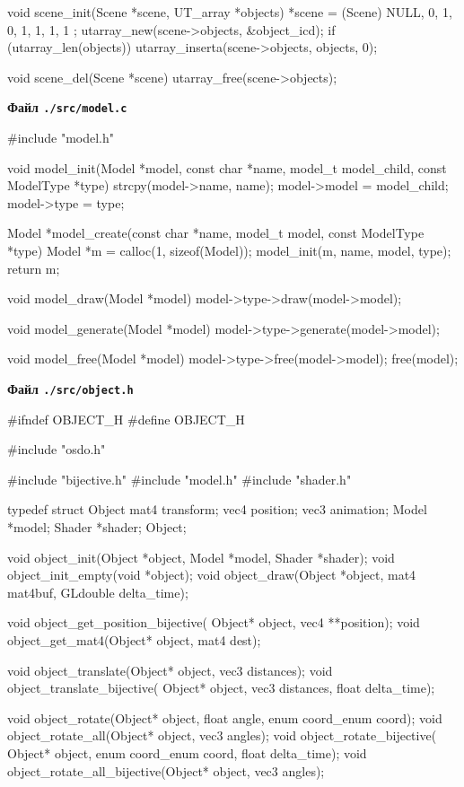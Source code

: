 \begin{multicols}{2}
\begin{ccode}
void scene_init(Scene *scene, UT_array *objects) {
    *scene = (Scene){
        NULL, 0, 1, 0, 1, 1, 1, 1
    };
    utarray_new(scene->objects, &object_icd);
    if (utarray_len(objects))
        utarray_inserta(scene->objects, objects, 0);
}

void scene_del(Scene *scene) {
    utarray_free(scene->objects);
}
\end{ccode}
\noindent\cprotect\textbf{Файл \verb+./src/model.c+}
\begin{ccode}
#include "model.h"

void model_init(Model *model, const char *name, model_t model_child, const ModelType *type) {
    strcpy(model->name, name);
    model->model = model_child;
    model->type = type;
}

Model *model_create(const char *name, model_t model, const ModelType *type) {
    Model *m = calloc(1, sizeof(Model));
    model_init(m, name, model, type);
    return m;
}

void model_draw(Model *model) {
    model->type->draw(model->model);
}

void model_generate(Model *model) {
    model->type->generate(model->model);
}

void model_free(Model *model) {
    model->type->free(model->model);
    free(model);
}
\end{ccode}
\noindent\cprotect\textbf{Файл \verb+./src/object.h+}
\begin{ccode}
#ifndef OBJECT_H
#define OBJECT_H

#include "osdo.h"

#include "bijective.h"
#include "model.h"
#include "shader.h"

typedef struct Object {
    mat4 transform;
    vec4 position;
    vec3 animation;
    Model *model;
    Shader *shader;
} Object;

void object_init(Object *object, Model *model, Shader *shader);
void object_init_empty(void *object);
void object_draw(Object *object, mat4 mat4buf, GLdouble delta_time);

void object_get_position_bijective(
        Object* object, vec4 **position);
void object_get_mat4(Object* object, mat4 dest);

void object_translate(Object* object, vec3 distances);
void object_translate_bijective(
        Object* object, vec3 distances, float delta_time);

void object_rotate(Object* object, float angle, enum coord_enum coord);
void object_rotate_all(Object* object, vec3 angles);
void object_rotate_bijective(
        Object* object, enum coord_enum coord, float delta_time);
void object_rotate_all_bijective(Object* object, vec3 angles);


\end{ccode}
\end{multicols}
